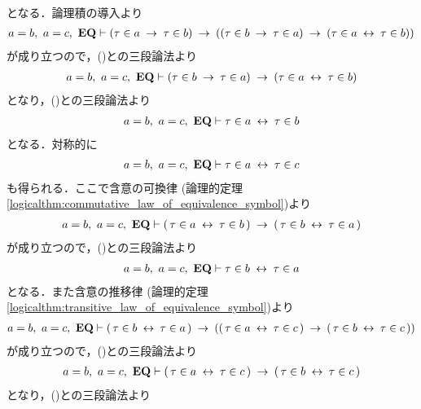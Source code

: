 \begin{sketch}
\begin{align}
		\end{align}
		となる．論理積の導入より
		\begin{align}
			a = b,\ a = c,\ \mbox{{\bf EQ}} \vdash (\tau \in a \hspace{0.25em}\rightarrow\hspace{0.25em} \tau \in b)
			\hspace{0.25em}\rightarrow\hspace{0.25em} ((\tau \in b \hspace{0.25em}\rightarrow\hspace{0.25em} \tau \in a) \hspace{0.25em}\rightarrow\hspace{0.25em} 
			(\tau \in a \hspace{0.25em}\leftrightarrow\hspace{0.25em} \tau \in b))
		\end{align}
		が成り立つので，()との三段論法より
		\begin{align}
			a = b,\ a = c,\ \mbox{{\bf EQ}} \vdash (\tau \in b \hspace{0.25em}\rightarrow\hspace{0.25em} \tau \in a) \hspace{0.25em}\rightarrow\hspace{0.25em} 
			(\tau \in a \hspace{0.25em}\leftrightarrow\hspace{0.25em} \tau \in b)
		\end{align}
		となり，()との三段論法より
		\begin{align}
			a = b,\ a = c,\ \EQAX \vdash \tau \in a \lrarrow \tau \in b
			\label{fom:thm_transitive_law_of_equality_4}
		\end{align}
		となる．対称的に
		\begin{align}
			a = b,\ a = c,\ \EQAX \vdash \tau \in a \lrarrow \tau \in c
			\label{fom:thm_transitive_law_of_equality_3}
		\end{align}
		も得られる．ここで含意の可換律
		(論理的定理\ref{logicalthm:commutative_law_of_equivalence_symbol})より
		\begin{align}
			a = b,\ a = c,\ \mbox{{\bf EQ}} \vdash (\, \tau \in a \hspace{0.25em}\leftrightarrow\hspace{0.25em} \tau \in b\, )
			\hspace{0.25em}\rightarrow\hspace{0.25em} (\, \tau \in b \hspace{0.25em}\leftrightarrow\hspace{0.25em} \tau \in a\, ) 
		\end{align}
		が成り立つので，()との三段論法より
		\begin{align}
			a = b,\ a = c,\ \EQAX \vdash \tau \in b \lrarrow \tau \in a
			\label{fom:thm_transitive_law_of_equality_5}
		\end{align}
		となる．また含意の推移律
		(論理的定理\ref{logicalthm:transitive_law_of_equivalence_symbol})より
		\begin{align}
			a = b,\ a = c,\ \mbox{{\bf EQ}} \vdash (\, \tau \in b \hspace{0.25em}\leftrightarrow\hspace{0.25em} \tau \in a\, )
			\hspace{0.25em}\rightarrow\hspace{0.25em} ((\, \tau \in a \hspace{0.25em}\leftrightarrow\hspace{0.25em} \tau \in c\, )
			\hspace{0.25em}\rightarrow\hspace{0.25em} (\, \tau \in b \hspace{0.25em}\leftrightarrow\hspace{0.25em} \tau \in c\, )) 
		\end{align}
		が成り立つので，()との三段論法より
		\begin{align}
			a = b,\ a = c,\ \mbox{{\bf EQ}} \vdash (\, \tau \in a \hspace{0.25em}\leftrightarrow\hspace{0.25em} \tau \in c\, )
			\hspace{0.25em}\rightarrow\hspace{0.25em} (\, \tau \in b \hspace{0.25em}\leftrightarrow\hspace{0.25em} \tau \in c\, )
		\end{align}
		となり，()との三段論法より
		\begin{align}

\end{align}
\end{sketch}
